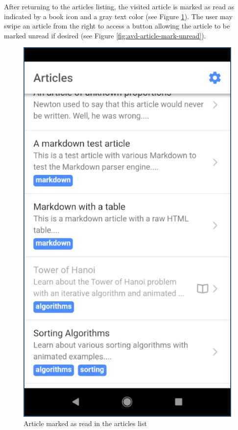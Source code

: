 \documentclass[12pt]{report}
\begin{document}
After returning to the articles listing, the visited article is marked as read
as indicated by a book icon and a gray text color (see Figure
\ref{fig:avd-article-read}). The user may swipe an article from the right to
access a button allowing the article to be marked unread if desired (see Figure
\ref{fig:avd-article-mark-unread}).

\begin{figure}
    \centering
    \includegraphics[scale=0.5]{images/avd-article-read.png}
    \caption{Article marked as read in the articles list}
    \label{fig:avd-article-read}
\end{figure}
\end{document}
